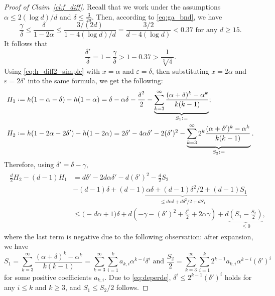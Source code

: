 \documentclass[10pt,a4paper]{amsart}
\newcommand\al{\alpha}
\newcommand\de{\delta}
\newcommand{\defeq}{\mathrel{\vcenter{\baselineskip0.5ex \lineskiplimit0pt
                     \hbox{\scriptsize.}\hbox{\scriptsize.}}}%
                     =}
\newcommand\eps{\varepsilon}
\newcommand\ga{\gamma}
\begin{document}
\begin{proof}[Proof of Claim~\ref{cl:f_diff}]
Recall that we work under the assumptions $\al\leq 2(\log d)/d$ and $\de \leq \frac{3}{2d}$. Then, according to \eqref{eq:ga_bnd}, we have 
%
\[ \frac{\ga}{\de} 
\leq \frac{\de}{1-2\al}
\leq \frac{3/(2d)}{1-4(\log d)/d} 
= \frac{3/2}{d-4(\log d)} < 0.37 
\text{ for any } d \geq 15. \]
%
It follows that 
\begin{equation} \label{eq:deperde}
\frac{\de'}{\de} = 1 - \frac{\ga}{\de} 
> 1- 0.37 
> \frac{1}{\sqrt[3]{4}} .
\end{equation}
%
Using \eqref{eq:h_diff2_simple} with $x=\al$ and $\eps=\de$, then substituting $x=2 \al$ and $\eps=2 \de'$ into the same formula, we get the following: 
%
\begin{align*} 
H_1 &\defeq h(1-\al-\de) - h(1-\al) 
= \de - \al\de - \frac{\de^2}{2}  
- \underbrace{\sum_{k=3}^\infty 
\frac{(\al+\de)^k-\al^k}{k(k-1)} }_{S_1 \defeq} ;\\
H_2 &\defeq h(1-2\al-2\de') - h(1-2\al) 
= 2 \de' - 4 \al \de' - 2 (\de')^2 
- \underbrace{\sum_{k=3}^\infty 
2^k \frac{(\al+\de')^k-\al^k}{k(k-1)}}_{S_2 \defeq} .
\end{align*}
%
Therefore, using $\de'=\de-\ga$, 
%
\begin{align} 
\begin{split}
\frac{d}{2} H_2 - (d-1)H_1
&= d\de'-2d\al\de' - d (\de')^2 - \frac{d}{2} S_2\\
&- (d-1) \de 
+ \underbrace{(d-1)\al \de + (d-1)\de^2/2 + (d-1) S_1}_
{\leq d\al \de + d\de^2/2 + d S_1} \\
&\leq \big( -d\al + 1 \big) \de + 
d\left( -\ga -(\de')^2 + \frac{\de^2}{2} + 2\al\ga \right) 
+ d\underbrace{ \left( S_1 - \frac{S_2}{2} \right)}_{\leq 0} ,
\label{eq:bnd3}
\end{split}
\end{align}
%
where the last term is negative due to the following observation: after expansion, we have 
%
\[ S_1 = \sum_{k=3}^\infty \frac{(\al+\de)^k-\al^k}{k(k-1)} 
= \sum_{k=3}^\infty \sum_{i=1}^k a_{k,i} \al^{k-i} \de^i 
\text{ and } 
\frac{S_2}{2} = \sum_{k=3}^\infty \sum_{i=1}^k 
2^{k-1} a_{k,i} \al^{k-i} (\de')^i
\]
%
for some positive coefficients $a_{k,i}$. Due to \eqref{eq:deperde}, $\de^i \leq 2^{k-1} (\de')^i$ holds for any $i \leq k$ and $k \geq 3$, and $S_1 \leq S_2/2$ follows.  


\end{proof}
\end{document}
